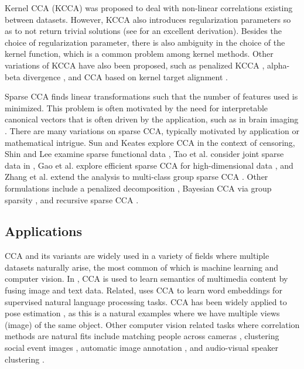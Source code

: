 Kernel CCA (KCCA) \cite{akaho2006kernel} was proposed to deal with non-linear correlations
existing between datasets. However, KCCA also introduces regularization parameters so as
to not return trivial solutions (see \cite{welling2005kcca} for an excellent
derivation). Besides the choice of regularization parameter, there is also ambiguity in
the choice of the kernel function, which is a common problem among kernel methods. Other
variations of KCCA have also been proposed, such as penalized KCCA
\cite{waaijenborg2009correlating}, alpha-beta divergence \cite{mandal2013non}, and CCA
based on kernel target alignment \cite{chang2013canonical}. 

Sparse CCA \cite{hardoon2011sparse} finds linear transformations such that the number of
features used is minimized. This problem is often motivated by the need for interpretable
canonical vectors that is often driven by the application, such as in brain imaging
\cite{yan2014accelerating}. There are many variations on sparse CCA, typically motivated
by application or mathematical intrigue. Sun and Keates \cite{sun2013canonical} explore
CCA in the context of censoring, Shin and Lee examine sparse functional data
\cite{shin2015canonical}, Tao et al. consider joint sparse data in
\cite{tao2014exploring}, Gao et al. explore efficient sparse CCA for high-dimensional
data \cite{gao2014efficient}, and Zhang et al. extend the analysis to multi-class group
sparse CCA \cite{zhang2013binary}. Other formulations include a penalized decomposition
\cite{witten2009penalized}, Bayesian CCA via group sparsity \cite{klami2013bayesian}, and
recursive sparse CCA \cite{chu2013sparse}.

\subsection{Applications}

CCA and its variants are widely used in a variety of fields where multiple datasets
naturally arise, the most common of which is machine learning and computer vision. In
\cite{hardoon2004canonical}, CCA is used to learn semantics of multimedia content by
fusing image and text data. Related, \cite{dhillon2011multi} uses CCA to learn word
embeddings for supervised natural language processing tasks. CCA has been widely applied
to pose estimation \cite{melzer2001nonlinear,zhai2015instance}, as this is a natural
examples where we have multiple views (image) of the same object. Other computer vision
related tasks where correlation methods are natural fits include matching people across
cameras \cite{lisanti2014matching}, clustering social event images
\cite{ahsan2014clustering}, automatic image annotation \cite{hardoon2006correlation}, and
audio-visual speaker clustering \cite{chaudhuri2009multi}.

